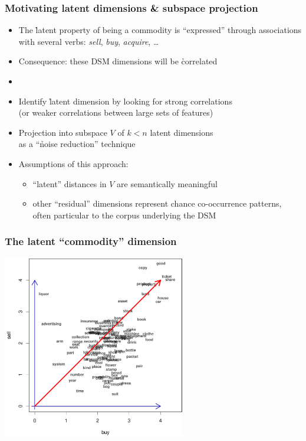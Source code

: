 
\begin{frame}
  \frametitle{Motivating latent dimensions \& subspace projection}

  \begin{itemize}
  \item The \h{latent property} of being a commodity is ``expressed''
    through associations with several verbs: \emph{sell}, \emph{buy},
    \emph{acquire}, \ldots
  \item Consequence: these DSM dimensions will be \h{correlated}
  \item[]
  \item Identify \h{latent dimension} by looking for strong correlations\\
    (or weaker correlations between large sets of features)%
  \item Projection into subspace $V$ of $k < n$ latent dimensions\\
    as a ``\h{noise reduction}'' technique \so {}
  \item Assumptions of this approach:
    \begin{itemize}
    \item ``latent'' distances in $V$ are semantically meaningful
    \item other ``residual'' dimensions represent chance co-occurrence
      patterns, often particular to the corpus underlying the DSM
    \end{itemize}
  \end{itemize}
\end{frame}

\begin{frame}[c]
  \frametitle{The latent ``commodity'' dimension}
  \begin{center}
    \ungap[1]
    \includegraphics[width=8cm]{img/3_buy_sell_labels_latent}
  \end{center}
\end{frame}

